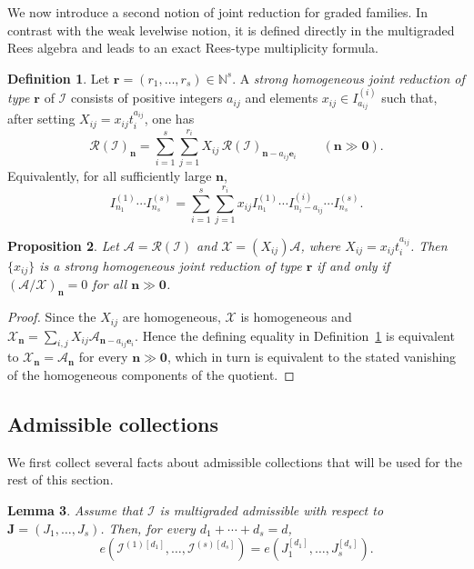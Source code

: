 \documentclass[reqno,12pt]{amsart}
\theoremstyle{plain}
\newtheorem{prop}{Proposition}[section]
\newtheorem{lem}[prop]{Lemma}
\theoremstyle{definition}
\newtheorem{defn}[prop]{Definition}
\theoremstyle{remark}
\newcommand{\N}{\mathbb N}
\numberwithin{equation}{section}
\begin{document}
We now introduce a second notion of joint reduction for graded families.
In contrast with the weak levelwise notion, it is defined directly in
the multigraded Rees algebra and leads to an exact Rees-type multiplicity
formula.

\begin{defn}
\label{def:strong}
Let $\mathbf r=(r_1,\ldots,r_s)\in\N^s$. A \emph{strong homogeneous
joint reduction of type $\mathbf r$} of $\boldsymbol{\mathcal I}$
consists of positive integers $a_{ij}$ and elements
$x_{ij}\in I_{a_{ij}}^{(i)}$ such that, after setting
$X_{ij}=x_{ij}t_i^{a_{ij}}$, one has
\[
\mathcal R(\boldsymbol{\mathcal I})_{\mathbf n}
=
\sum_{i=1}^{s}\sum_{j=1}^{r_i}
X_{ij}\,
\mathcal R(\boldsymbol{\mathcal I})_{\mathbf n-a_{ij}\mathbf e_i}
\qquad(\mathbf n\gg\mathbf0).
\]
Equivalently, for all sufficiently large $\mathbf n$,
\[
I_{n_1}^{(1)}\cdots I_{n_s}^{(s)}
=
\sum_{i=1}^{s}\sum_{j=1}^{r_i}
 x_{ij}
 I_{n_1}^{(1)}\cdots I_{n_i-a_{ij}}^{(i)}\cdots I_{n_s}^{(s)}.
\]

\end{defn}

\begin{prop}
\label{prop:intrinsic}
Let $\mathcal A=\mathcal R(\boldsymbol{\mathcal I})$ and
$\mathcal X=(X_{ij})\mathcal A$, where
$X_{ij}=x_{ij}t_i^{a_{ij}}$. Then $\{x_{ij}\}$ is a strong homogeneous
joint reduction of type $\mathbf r$ if and only if
$(\mathcal A/\mathcal X)_{\mathbf n}=0$ for all
$\mathbf n\gg\mathbf0$.
\end{prop}

\begin{proof}
Since the $X_{ij}$ are homogeneous, $\mathcal X$ is homogeneous and $\mathcal X_{\mathbf n}
=
\sum_{i,j}X_{ij}\mathcal A_{\mathbf n-a_{ij}\mathbf e_i}.$
Hence the defining equality in Definition~\ref{def:strong} is equivalent
to $\mathcal X_{\mathbf n}=\mathcal A_{\mathbf n}$ for every
$\mathbf n\gg\mathbf0$, which in turn is equivalent to the stated
vanishing of the homogeneous components of the quotient.
\end{proof}

\subsection*{Admissible collections}

We first collect several facts about admissible collections that will be
used for the rest of this section.

\begin{lem}
\label{lem:admissible-invariance}
Assume that $\boldsymbol{\mathcal I}$ is multigraded admissible with
respect to $\mathbf J=(J_1,\ldots,J_s)$. Then, for every
$d_1+\cdots+d_s=d$,
\[
e\!\left(\mathcal I^{(1)[d_1]},\ldots,
\mathcal I^{(s)[d_s]}\right)
=
e(J_1^{[d_1]},\ldots,J_s^{[d_s]}).
\]
\end{lem}
\end{document}
